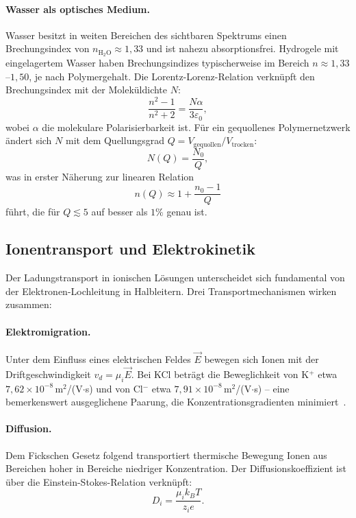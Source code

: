 ﻿\documentclass[a4paper,12pt]{scrreprt}
\theoremstyle{definition}
\begin{document}
\paragraph{Wasser als optisches Medium.}
Wasser besitzt in weiten Bereichen des sichtbaren Spektrums einen
Brechungsindex von $n_\text{H$_2$O} \approx 1{,}33$ und ist nahezu
absorptionsfrei. Hydrogele mit eingelagertem Wasser haben Brechungsindizes
typischerweise im Bereich $n \approx 1{,}33$--$1{,}50$, je nach Polymergehalt.
Die Lorentz-Lorenz-Relation verknüpft den Brechungsindex mit der
Moleküldichte $N$:
\begin{equation}
  \frac{n^2 - 1}{n^2 + 2} = \frac{N \alpha}{3\varepsilon_0},
\end{equation}
wobei $\alpha$ die molekulare Polarisierbarkeit ist. Für ein gequollenes
Polymernetzwerk ändert sich $N$ mit dem Quellungsgrad $Q = V_\text{gequollen}/V_\text{trocken}$:
\begin{equation}
  N(Q) = \frac{N_0}{Q},
  \label{eq:dichte-quellung}
\end{equation}
was in erster Näherung zur linearen Relation
\begin{equation}
  n(Q) \approx 1 + \frac{n_0 - 1}{Q}
  \label{eq:n-quellung}
\end{equation}
führt, die für $Q \lesssim 5$ auf besser als $1\%$ genau ist.

\subsection{Ionentransport und Elektrokinetik}

Der Ladungstransport in ionischen Lösungen unterscheidet sich fundamental
von der Elektronen-Lochleitung in Halbleitern. Drei Transportmechanismen
wirken zusammen:

\paragraph{Elektromigration.}
Unter dem Einfluss eines elektrischen Feldes $\vec{E}$ bewegen sich Ionen
mit der Driftgeschwindigkeit $v_d = \mu_i \vec{E}$. Bei KCl beträgt die
Beweglichkeit von K$^+$ etwa $7{,}62 \times 10^{-8}$\,m$^2$/(V$\cdot$s)
und von Cl$^-$ etwa $7{,}91 \times 10^{-8}$\,m$^2$/(V$\cdot$s) -- eine
bemerkenswert ausgeglichene Paarung, die Konzentrationsgradienten
minimiert~\cite{atkins2018}.

\paragraph{Diffusion.}
Dem Fickschen Gesetz folgend transportiert thermische Bewegung Ionen aus
Bereichen hoher in Bereiche niedriger Konzentration. Der Diffusionskoeffizient
ist über die Einstein-Stokes-Relation verknüpft:
\begin{equation}
  D_i = \frac{\mu_i k_B T}{z_i e}.
  \label{eq:einstein_stokes}
\end{equation}
\end{document}

